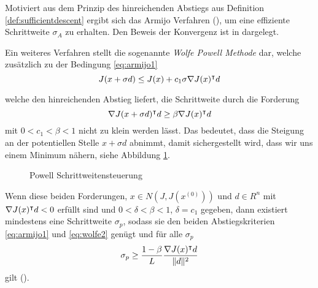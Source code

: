 Motiviert aus dem Prinzip des hinreichenden Abstiegs aus Definition \ref{def:sufficientdescent} ergibt sich das Armijo Verfahren (\cite[Verfahren 4.5.4]{alt2002nichtlineare}), um eine effiziente Schrittweite $\sigma_A$ zu erhalten.
Den Beweis der Konvergenz ist in  \cite[Satz 4.5.5]{alt2002nichtlineare} dargelegt.

Ein weiteres Verfahren stellt die sogenannte \textit{Wolfe Powell Methode} dar, welche zusätzlich zu der Bedingung \eqref{eq:armijo1}
\begin{equation}
 J(x+\sigma d) \leq J(x) + c_1\sigma \nabla J(x)^\intercal d
\end{equation}

welche den hinreichenden Abstieg liefert, die Schrittweite durch die Forderung
\begin{equation}
\label{eq:wolfe2}
 \nabla J(x+\sigma d)^\intercal d\geq \beta \nabla J(x)^\intercal d
\end{equation}
mit $0<c_1<\beta<1$ nicht zu klein werden lässt. Das bedeutet, dass die Steigung an der potentiellen Stelle $x+\sigma d$ abnimmt, damit sichergestellt wird, dass wir uns einem Minimum nähern, siehe Abbildung \ref{fig:powell}. 

\begin{figure}
\centering

\caption{Powell Schrittweitensteuerung}
\label{fig:powell}
\end{figure}
Wenn diese beiden Forderungen, $x\in N(J,J(x^{(0)}))$ und $d\in R^n$ mit $\nabla J(x)^\intercal d<0$ erfüllt sind und $0<\delta<\beta<1$, $\delta =c_1$ gegeben, dann existiert mindestens eine Schrittweite $\sigma_p$, sodass sie den beiden Abstiegskriterien \eqref{eq:armijo1} und \eqref{eq:wolfe2} genügt und für alle $\sigma_p$
\[
 \sigma_p \geq \frac{1-\beta}{L}\frac{\nabla J(x)^\intercal d}{\|d\|^2}
\]
gilt (\cite[Satz 4.5.8.]{alt2002nichtlineare}).

